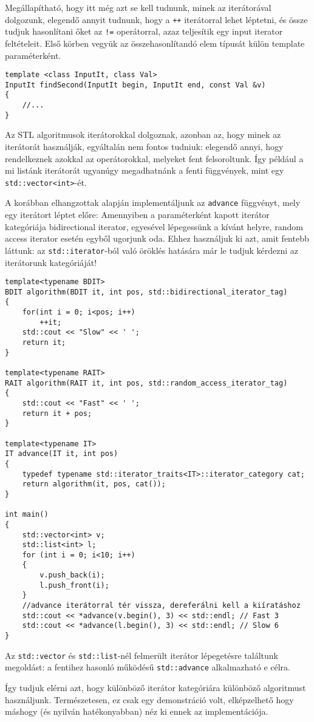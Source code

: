 \documentclass[../cpp_book/cpp_book.tex]{subfiles}
\begin{document}
	\smallskip
	Megállapítható, hogy itt még azt se kell tudnunk, minek az iterátorával dolgozunk, elegendő annyit tudnunk, hogy a \texttt{++} iterátorral lehet léptetni, és össze tudjuk hasonlítani őket az \texttt{!=} operátorral, azaz teljesítik egy input iterator feltételeit. Első körben vegyük az összehasonlítandó elem típusát külön template paraméterként.
	\begin{lstlisting}
template <class InputIt, class Val>
InputIt findSecond(InputIt begin, InputIt end, const Val &v)
{
	//...
}
	\end{lstlisting}
	
	Az STL algoritmusok iterátorokkal dolgoznak, azonban az, hogy minek az iterátorát használják, egyáltalán nem fontos tudniuk: elegendő annyi, hogy rendelkeznek azokkal az operátorokkal, melyeket fent felsoroltunk. Így például a mi listánk iterátorát ugyanúgy megadhatnánk a fenti függvények, mint egy \texttt{std::vector<int>}-ét.
	
	\medskip
	A korábban elhangzottak alapján implementáljunk az \texttt{advance} függvényt, mely egy iterátort léptet előre: Amennyiben a paraméterként kapott iterátor kategóriája bidirectional iterator, egyesével lépegessünk a kívánt helyre, random access iterator esetén egyből ugorjunk oda.  Ehhez használjuk ki azt, amit fentebb láttunk: az \texttt{std::iterator}-ból való öröklés hatására már le tudjuk kérdezni az iterátorunk kategóriáját!
	\begin{lstlisting}
template<typename BDIT> 
BDIT algorithm(BDIT it, int pos, std::bidirectional_iterator_tag) 
{
	for(int i = 0; i<pos; i++)
		++it;
	std::cout << "Slow" << ' ';
	return it;
}

template<typename RAIT>
RAIT algorithm(RAIT it, int pos, std::random_access_iterator_tag) 
{
	std::cout << "Fast" << ' ';
	return it + pos;
}

template<typename IT> 
IT advance(IT it, int pos) 
{
	typedef typename std::iterator_traits<IT>::iterator_category cat;
	return algorithm(it, pos, cat());
}

int main() 
{
	std::vector<int> v;
	std::list<int> l;
	for (int i = 0; i<10; i++)
	{
		v.push_back(i);
		l.push_front(i);
	}
	//advance iterátorral tér vissza, dereferálni kell a kiíratáshoz
	std::cout << *advance(v.begin(), 3) << std::endl; // Fast 3
	std::cout << *advance(l.begin(), 3) << std::endl; // Slow 6
}  
	\end{lstlisting}
	\begin{note}
		Az \texttt{std::vector} és \texttt{std::list}-nél felmerült iterátor lépegetésre találtunk megoldást: a fentihez hasonló működésű \texttt{std::advance} alkalmazható e célra.
	\end{note}
	Így tudjuk elérni azt, hogy különböző iterátor kategóriára különböző algoritmust használjunk. Természetesen, ez csak egy demonstráció volt, elképzelhető hogy máshogy (és nyilván hatékonyabban) néz ki ennek az implementációja.
	\medskip
	
\end{document}
